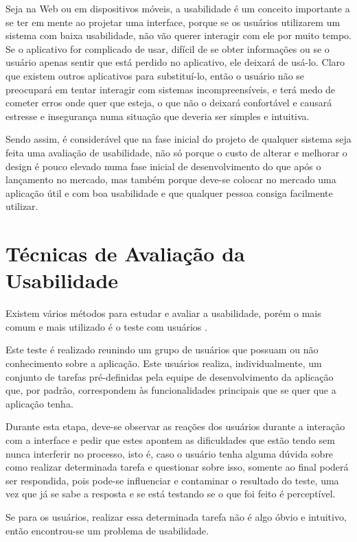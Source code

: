Seja na Web ou em dispositivos móveis, a usabilidade é um conceito importante a se ter em mente ao projetar uma interface, porque se os usuários utilizarem um sistema com baixa usabilidade, não vão querer interagir com ele por muito tempo. Se o aplicativo for complicado de usar, difícil de se obter informações ou se o usuário apenas sentir que está perdido no aplicativo, ele deixará de usá-lo. Claro que existem outros aplicativos para substituí-lo, então o usuário não se preocupará em tentar interagir com sistemas incompreensíveis, e terá medo de cometer erros onde quer que esteja, o que não o deixará confortável e causará estresse e insegurança numa situação que deveria ser simples e intuitiva.

Sendo assim, é considerável que na fase inicial do projeto de qualquer sistema seja feita uma avaliação de usabilidade, não só porque o custo de alterar e melhorar o design é pouco elevado numa fase inicial de desenvolvimento do que após o lançamento no mercado, mas também porque deve-se colocar no mercado uma aplicação útil e com boa usabilidade e que qualquer pessoa consiga facilmente utilizar.

\section{Técnicas de Avaliação da Usabilidade}
\label{Técnicas_de_Avaliação_da_Usabilidade}

Existem vários métodos para estudar e avaliar a usabilidade, porém o mais comum e mais utilizado é o teste com usuários \cite{nielsen-usabilidade}.

Este teste é realizado reunindo um grupo de usuários que possuam ou não conhecimento sobre a aplicação. Este usuários realiza, individualmente, um conjunto de tarefas pré-definidas pela equipe de desenvolvimento da aplicação que, por padrão, correspondem às funcionalidades principais que se quer que a aplicação tenha.

Durante esta etapa, deve-se observar as reações dos usuários durante a interação com a interface e pedir que estes apontem as dificuldades que estão tendo sem nunca interferir no processo, isto é, caso o usuário tenha alguma dúvida sobre como realizar determinada tarefa e questionar sobre isso, somente ao final poderá ser respondida, pois pode-se influenciar e contaminar o resultado do teste, uma vez que já se sabe a resposta e se está testando se o que foi feito é perceptível.

Se para os usuários, realizar essa determinada tarefa não é algo óbvio e intuitivo, então encontrou-se um problema de usabilidade.

